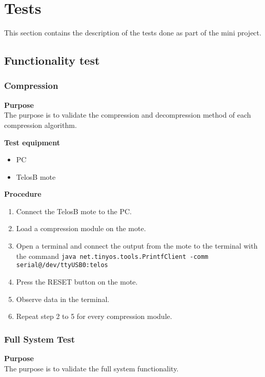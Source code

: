 \section{Tests}
This section contains the description of the tests done as part of the mini project.

\subsection{Functionality test}


\subsubsection{Compression}

\textbf{Purpose}\\
The purpose is to validate the compression and decompression method of each compression algorithm.

\textbf{Test equipment}

\begin{itemize}
\item PC 
\item TelosB mote
\end{itemize}

\textbf{Procedure}
\vspace{-15pt}
\begin{enumerate}
\item Connect the TelosB mote to the PC.
\item Load a compression module on the mote.
\item Open a terminal and connect the output from the mote to the terminal with the command \texttt{java net.tinyos.tools.PrintfClient -comm serial@/dev/ttyUSB0:telos}
\item Press the RESET button on the mote.
\item Observe data in the terminal.
\item Repeat step 2 to 5 for every compression module.
\end{enumerate}

\subsubsection{Full System Test}
\label{subs:FST}
\textbf{Purpose}\\
The purpose is to validate the full system functionality.

